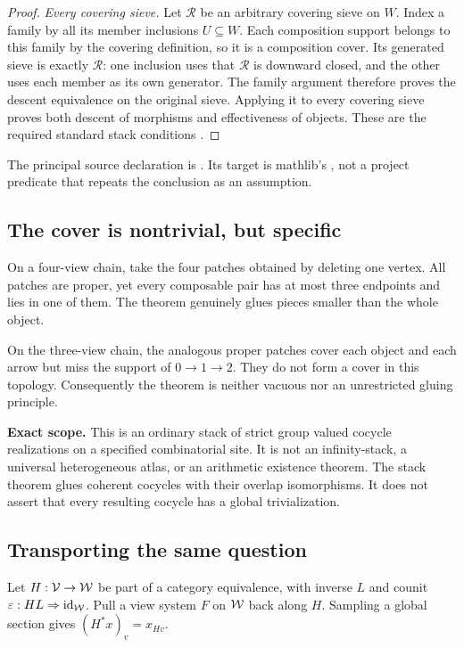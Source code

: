 \begin{proof}
\emph{Every covering sieve.} Let $\mathcal R$ be an arbitrary covering sieve on $W$. Index a family by all its member inclusions $U\subseteq W$. Each composition support belongs to this family by the covering definition, so it is a composition cover. Its generated sieve is exactly $\mathcal R$: one inclusion uses that $\mathcal R$ is downward closed, and the other uses each member as its own generator. The family argument therefore proves the descent equivalence on the original sieve. Applying it to every covering sieve proves both descent of morphisms and effectiveness of objects. These are the required standard stack conditions \cite{stacks-stack,mathlib-stack}.
\end{proof}
The principal source declaration is . Its target is mathlib's , not a project predicate that repeats the conclusion as an assumption.

\subsection{The cover is nontrivial, but specific}
On a four-view chain, take the four patches obtained by deleting one vertex. All patches are proper, yet every composable pair has at most three endpoints and lies in one of them. The theorem genuinely glues pieces smaller than the whole object.

On the three-view chain, the analogous proper patches cover each object and each arrow but miss the support of \(0\to1\to2\). They do not form a cover in this topology. Consequently the theorem is neither vacuous nor an unrestricted gluing principle.

\begin{scopebox}
\textbf{Exact scope.} This is an ordinary stack of strict group valued cocycle realizations on a specified combinatorial site. It is not an infinity-stack, a universal heterogeneous atlas, or an arithmetic existence theorem. The stack theorem glues coherent cocycles with their overlap isomorphisms. It does not assert that every resulting cocycle has a global trivialization.
\end{scopebox}

\label{sec:relative}
\subsection{Transporting the same question}
Let \(H:\mathcal V\to\mathcal W\) be part of a category equivalence, with inverse \(L\) and counit \(\varepsilon:HL\Rightarrow\operatorname{id}_\mathcal W\). Pull a view system \(F\) on \(\mathcal W\) back along \(H\). Sampling a global section gives \((H^*x)_v=x_{Hv}\).

